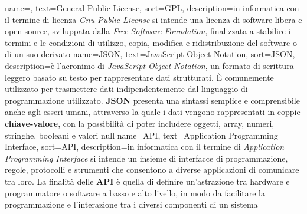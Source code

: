      {
        name=,
        text=General Public License,
        sort=GPL,
        description={in informatica con il termine di licenza \textit{Gnu Public License} si intende  
        una licenza di software libera e open source, sviluppata dalla \textit{Free Software Foundation}, finalizzata a stabilire i termini e le condizioni 
        di utilizzo, copia, modifica e ridistribuzione del software o di un suo derivato}
    }
    {
        name={JSON},
        text=JavaScript Object Notation,
        sort=JSON,
        description={è l'acronimo di \textit{JavaScript Object Notation}, un formato di scrittura leggero basato su testo per rappresentare dati strutturati. 
        È comunemente utilizzato per trasmettere dati indipendentemente dal linguaggio di programmazione utilizzato. \textbf{JSON} presenta una sintassi semplice e comprensibile anche agli 
        esseri umani, attraverso la quale i dati vengono rappresentati in coppie \textbf{chiave-valore}, con la possibilità di poter includere 
        oggetti, array, numeri, stringhe, booleani e valori null}
    }
{
    name={API},
    text=Application Programming Interface,
    sort=API,
    description={in informatica con il termine di \textit{Application Programming Interface} si intende un insieme di interfacce di 
    programmazione, regole, protocolli e strumenti che consentono a diverse applicazioni di comunicare tra loro. La finalità delle 
    \textbf{API} è quella di definire un'astrazione tra hardware e programmatore o software a basso e alto livello, in modo da facilitare
    la programmazione e l'interazione tra i diversi componenti di un sistema}
}

